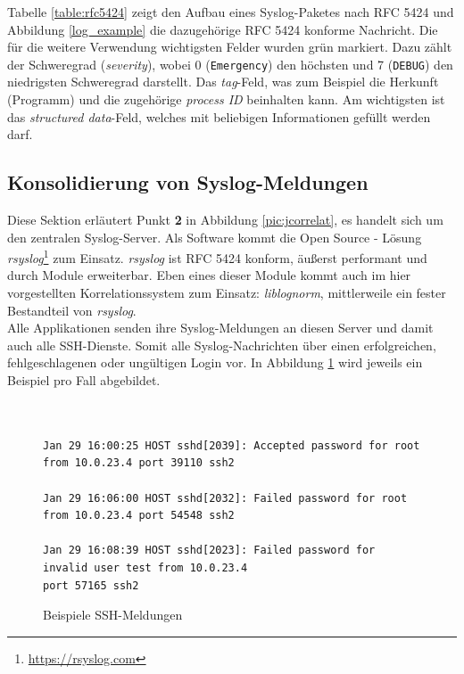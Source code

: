 Tabelle \ref{table:rfc5424} zeigt den Aufbau eines Syslog-Paketes nach RFC 5424 und 
Abbildung \ref{log_example} die dazugehörige RFC 5424 konforme Nachricht. Die für 
die weitere Verwendung wichtigsten Felder wurden grün markiert. Dazu zählt der 
Schweregrad (\textit{severity}), wobei 0 (\texttt{Emergency}) den höchsten und 7 
(\texttt{DEBUG}) 
den niedrigsten Schweregrad darstellt. Das \textit{tag}-Feld, was zum Beispiel die 
Herkunft (Programm) und die zugehörige \textit{process ID} beinhalten kann. Am 
wichtigsten ist das \textit{structured data}-Feld, welches mit beliebigen Informationen 
gefüllt werden darf.

\subsection{Konsolidierung von Syslog-Meldungen}\label{syslog-konsolidierung}

Diese Sektion erläutert Punkt \textbf{2} in Abbildung \ref{pic:jcorrelat}, es handelt 
sich um den zentralen Syslog-Server. Als Software kommt die Open Source - Lösung 
\textit{rsyslog}\footnote{\url{https://rsyslog.com}} zum Einsatz. \textit{rsyslog} ist 
RFC 5424 konform, äußerst performant und durch Module erweiterbar. Eben eines dieser 
Module kommt auch im hier vorgestellten Korrelationssystem zum Einsatz: 
\textit{liblognorm}, mittlerweile ein fester Bestandteil von \textit{rsyslog}.\\ 

Alle Applikationen senden ihre Syslog-Meldungen an diesen Server und damit auch alle 
SSH-Dienste. Somit alle Syslog-Nachrichten über einen erfolgreichen, 
fehlgeschlagenen oder ungültigen Login vor. In Abbildung \ref{ssh_example} wird 
jeweils ein Beispiel pro Fall abgebildet.

\begin{figure}[h]
    \caption{Beispiele SSH-Meldungen}
    \label{ssh_example}\vspace{0.2cm}
    \centering
    \begin{shaded*}
    \small{      
        \begin{verbatim}        


Jan 29 16:00:25 HOST sshd[2039]: Accepted password for root from 10.0.23.4 port 39110 ssh2
        
Jan 29 16:06:00 HOST sshd[2032]: Failed password for root from 10.0.23.4 port 54548 ssh2

Jan 29 16:08:39 HOST sshd[2023]: Failed password for invalid user test from 10.0.23.4 
port 57165 ssh2
\end{verbatim}}
\end{shaded*}
\end{figure}

